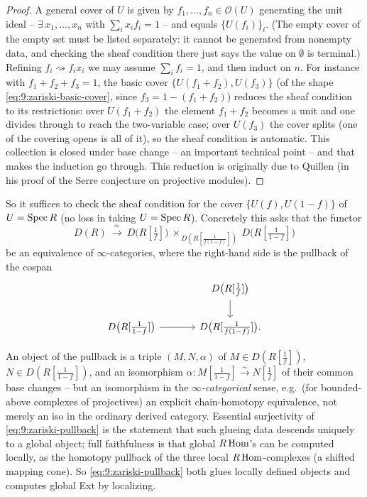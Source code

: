 \begin{proof}
A general cover of $U$ is given by $f_{1},\dots,f_{n}\in\mathcal O(U)$
generating the unit ideal -- $\exists\,x_{1},\dots,x_{n}$ with $\sum_{i}x_{i}
f_{i}=1$ -- and equals $\{U(f_{i})\}_{i}$. (The empty cover of the empty set
must be listed separately: it cannot be generated from nonempty data, and
checking the sheaf condition there just says the value on $\emptyset$ is
terminal.) Refining $f_{i}\rightsquigarrow f_{i}x_{i}$ we may assume
$\sum_{i}f_{i}=1$, and then induct on $n$. For instance with $f_{1}+f_{2}+f_{3}=
1$, the basic cover $\{U(f_{1}+f_{2}),U(f_{3})\}$ (of the shape
\eqref{eq:9:zariski-basic-cover}, since $f_{3}=1-(f_{1}+f_{2})$) reduces the
sheaf condition to its restrictions: over $U(f_{1}+f_{2})$ the element
$f_{1}+f_{2}$ becomes a unit and one divides through to reach the two-variable
case; over $U(f_{3})$ the cover splits (one of the covering opens is all of it),
so the sheaf condition is automatic. This collection is closed under base
change -- an important technical point -- and that makes the induction go
through. This reduction is originally due to Quillen (in his proof of the
Serre conjecture on projective modules).
\end{proof}

So it suffices to check the sheaf condition for the cover $\{U(f),U(1-f)\}$ of
$U=\operatorname{Spec} R$ (no loss in taking $U=\operatorname{Spec} R$). Concretely this asks that the
functor
\begin{equation}
\label{eq:9:zariski-pullback}
D(R)\ \xrightarrow{\ \simeq\ }\ D\bigl(R[\tfrac1f]\bigr)\ \times_{\,D(R[\frac1{
f(1-f)}])}\ D\bigl(R[\tfrac1{1-f}]\bigr)
\end{equation}
be an equivalence of $\infty$-categories, where the right-hand side is the
pullback of the cospan
\begin{equation*}
\begin{tikzcd}[column sep=large]
& D\bigl(R[\tfrac1f]\bigr) \arrow[d] \\
D\bigl(R[\tfrac1{1-f}]\bigr) \arrow[r] & D\bigl(R[\tfrac1{f(1-f)}]\bigr).
\end{tikzcd}
\end{equation*}

\begin{remark}
\label{rmk:9:pullback-concrete}
An object of the pullback is a triple $(M,N,\alpha)$ of $M\in D(R[\tfrac1f])$,
$N\in D(R[\tfrac1{1-f}])$, and an isomorphism $\alpha\colon M[\tfrac1{1-f}]
\xrightarrow{\sim}N[\tfrac1f]$ of their common base changes -- but an
isomorphism in the \emph{$\infty$-categorical} sense, e.g.\ (for bounded-above
complexes of projectives) an explicit chain-homotopy equivalence, not merely an
iso in the ordinary derived category. Essential surjectivity of
\eqref{eq:9:zariski-pullback} is the statement that such glueing data descends
uniquely to a global object; full faithfulness is that global $R\operatorname{Hom}$'s can be
computed locally, as the homotopy pullback of the three local $R\operatorname{Hom}$-complexes
(a shifted mapping cone). So \eqref{eq:9:zariski-pullback} both glues locally
defined objects and computes global Ext by localizing.
\end{remark}

